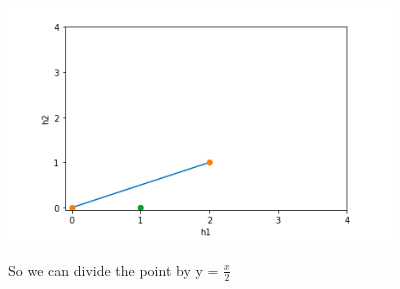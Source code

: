 \begin{example}
\begin{center}
    \includegraphics[width=4in]{images/Chapter 10/idea1.png}
\end{center}



So we can divide the point by y = $\frac{x}{2}$\\


\end{example}
